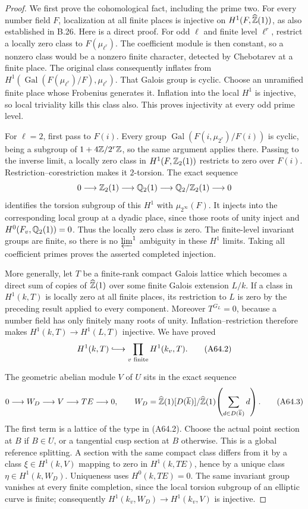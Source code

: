 \begin{proof}
We first prove the cohomological fact, including the prime two.
For every number field $F$, localization at all finite places is
injective on $H^1(F,\widehat{\mathbb Z}(1))$, as also established in B.26.
Here is a direct proof. For odd $\ell$ and finite level $\ell^r$,
restrict a locally zero class to $F(\mu_{\ell^r})$. The coefficient
module is then constant, so a nonzero class would be a nonzero
finite character, detected by Chebotarev at a finite place.
The original class consequently inflates from
$H^1(\operatorname{Gal}(F(\mu_{\ell^r})/F),\mu_{\ell^r})$.
That Galois group is cyclic. Choose an unramified finite place
whose Frobenius generates it. Inflation into the local $H^1$
is injective, so local triviality kills this class also. This
proves injectivity at every odd prime level.

For $\ell=2$, first pass to $F(i)$. Every group
$\operatorname{Gal}(F(i,\mu_{2^r})/F(i))$ is cyclic, being a
subgroup of $1+4\mathbb Z/2^r\mathbb Z$, so the same argument applies there.
Passing to the inverse limit, a locally zero class in
$H^1(F,\mathbb Z_2(1))$ restricts to zero over $F(i)$.
Restriction--corestriction makes it $2$-torsion. The exact
sequence
\[
 0\longrightarrow\mathbb Z_2(1)\longrightarrow\mathbb Q_2(1)
   \longrightarrow\mathbb Q_2/\mathbb Z_2(1)\longrightarrow0
\]
identifies the torsion subgroup of this $H^1$ with
$\mu_{2^\infty}(F)$. It injects into the corresponding local
group at a dyadic place, since those roots of unity inject and
$H^0(F_v,\mathbb Q_2(1))=0$. Thus the locally zero class is zero.
The finite-level invariant groups are finite, so there is no
$\varprojlim^1$ ambiguity in these $H^1$ limits. Taking all
coefficient primes proves the asserted completed injection.

More generally, let $T$ be a finite-rank compact Galois lattice
which becomes a direct sum of copies of $\widehat{\mathbb Z}(1)$ over
some finite Galois extension $L/k$. If a class in $H^1(k,T)$
is locally zero at all finite places, its restriction to $L$
is zero by the preceding result applied to every component.
Moreover $T^{G_L}=0$, because a number field has only finitely
many roots of unity. Inflation--restriction therefore makes
$H^1(k,T)\to H^1(L,T)$ injective. We have proved
\[
 H^1(k,T)\lhook\joinrel\longrightarrow
       \prod_{v\text{ finite}}H^1(k_v,T).
 \tag{A64.2}
\]

The geometric abelian module $V$ of $U$ sits in the exact
sequence
\[
 0\longrightarrow W_D\longrightarrow V\longrightarrow T E
       \longrightarrow0,\qquad
 W_D=\widehat{\mathbb Z}(1)[D(\overline k)]/
             \widehat{\mathbb Z}(1)\!\left(\sum_{d\in D(\overline k)}d\right).
 \tag{A64.3}
\]
The first term is a lattice of the type in (A64.2).
Choose the actual point section at $B$ if $B\in U$, or a
tangential cusp section at $B$ otherwise. This is a global
reference splitting. A section with the same compact class
differs from it by a class $\xi\in H^1(k,V)$ mapping to zero
in $H^1(k,T E)$, hence by a unique class
$\eta\in H^1(k,W_D)$. Uniqueness uses
$H^0(k,T E)=0$. The same invariant group vanishes at every
finite completion, since the local torsion subgroup of an
elliptic curve is finite; consequently
$H^1(k_v,W_D)\to H^1(k_v,V)$ is injective.


\end{proof}
